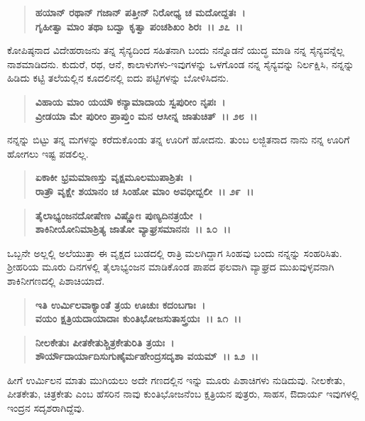 \begin{verse}
\textbf{ಹಯಾನ್ ರಥಾನ್ ಗಜಾನ್ ಪತ್ತೀನ್ ನಿರೋಧ್ಯ ಚ ಮದೋದ್ದತಃ~।}\\\textbf{ಗೃಹೀತ್ವಾ ಮಾಂ ತಥಾ ಬದ್ವಾ ಕೃತ್ವಾ ಪಂಚಶಿಖಂ ಶಿರಃ~।। ೨೭~।।} 
\end{verse}

ಕೋಪಿಷ್ಠನಾದ ವಿದೇಹರಾಜನು ತನ್ನ ಸೈನ್ಯದಿಂದ ಸಹಿತನಾಗಿ ಬಂದು ನನ್ನೊಡನೆ ಯುದ್ಧ ಮಾಡಿ ನನ್ನ ಸೈನ್ಯವನ್ನೆಲ್ಲ ನಾಶಮಾಡಿದನು. ಕುದುರೆ, ರಥ, ಆನೆ, ಕಾಲಾಳುಗಳು-ಇವುಗಳನ್ನು ಒಳಗೊಂಡ ನನ್ನ ಸೈನ್ಯವನ್ನು ನಿರ್ಲಕ್ಷಿಸಿ, ನನ್ನನ್ನು ಹಿಡಿದು ಕಟ್ಟಿ ತಲೆಯಲ್ಲಿನ ಕೂದಲಿನಲ್ಲಿ ಐದು ಪಟ್ಟಿಗಳನ್ನು ಬೋಳಿಸಿದನು.

\begin{verse}
\textbf{ವಿಹಾಯ ಮಾಂ ಯಯೌ ಕನ್ಯಾಮಾದಾಯ ಸ್ವಪುರೀಂ ನೃಪಃ~।}\\\textbf{ವ್ರೀಡಯಾ ಮೇ ಪುರೀಂ ಪ್ರಾಪ್ತುಂ ಮನ ಆಸೀನ್ನ ಜಾತುಚಿತ್~।। ೨೮~।।} 
\end{verse}

ನನ್ನನ್ನು ಬಿಟ್ಟು ತನ್ನ ಮಗಳನ್ನು ಕರೆದುಕೊಂಡು ತನ್ನ ಊರಿಗೆ ಹೋದನು. ತುಂಬ ಲಜ್ಜಿತ\-ನಾದ ನಾನು ನನ್ನ ಊರಿಗೆ ಹೋಗಲು ಇಷ್ಟ ಪಡಲಿಲ್ಲ.

\begin{verse}
\textbf{ಏಕಾಕೀ ಭ್ರಮಮಾಣಸ್ತು ವೃಕ್ಷಮೂಲಮುಪಾಶ್ರಿತಃ~।}\\\textbf{ರಾತ್ರೌ ವೃಕ್ಷೇ ಶಯಾನಂ ಚ ಸಿಂಹೋ ಮಾಂ ಅವಧೀದ್ಬಲೀ~।। ೨೯~।। }
\end{verse}

\begin{verse}
\textbf{ತೈಲಾಭ್ಯಂಜನದೋಷೇಣ ವಿಷ್ಣೋಃ ಪುಣ್ಯದಿನತ್ರಯೇ~।}\\\textbf{ಶಾಕಿನೀಯೋನಿಮಾಶ್ರಿತ್ಯ ಜಾತೋ ವ್ಯಾಘ್ರಸಮಾನನಃ~।। ೩೦~।।} 
\end{verse}

ಒಬ್ಬನೇ ಅಲ್ಲಲ್ಲಿ ಅಲೆಯುತ್ತಾ ಈ ವೃಕ್ಷದ ಬುಡದಲ್ಲಿ ರಾತ್ರಿ ಮಲಗಿದ್ದಾಗ ಸಿಂಹವು ಬಂದು ನನ್ನನ್ನು ಸಂಹರಿಸಿತು. ಶ‍್ರೀಹರಿಯ ಮೂರು ದಿನಗಳಲ್ಲಿ ತೈಲಾಭ್ಯಂಜನ ಮಾಡಿಕೊಂಡ ಪಾಪದ ಫಲವಾಗಿ ವ್ಯಾಘ್ರದ ಮುಖವುಳ್ಳವನಾಗಿ ಶಾಕಿನೀಗಣದಲ್ಲಿ ಪಿಶಾಚಿಯಾದೆ.

\begin{verse}
\textbf{ಇತಿ ಉರ್ಮಿಲವಾಕ್ಯಾಂತೆ ತ್ರಯ ಊಚುಃ ಕದಂಬಗಾಃ~।}\\\textbf{ವಯಂ ಕ್ಷತ್ರಿಯದಾಯಾದಾಃ ಕುಂತಿಭೋಜಸುತಾಸ್ತ್ರಯಃ~।। ೩೧~।। }
\end{verse}

\begin{verse}
\textbf{ನೀಲಕೇತುಃ ಪೀತಕೇತುಶ್ಚಿತ್ರಕೇತುರಿತಿ ತ್ರಯಃ~।}\\\textbf{ಶೌರ್ಯೌದಾರ್ಯಾದಿಸುಗುಣೈರ್ಮಹೇಂದ್ರಸದೃಶಾ ವಯಮ್~।। ೩೨~।। }
\end{verse}

ಹೀಗೆ ಉರ್ಮಿಲನ ಮಾತು ಮುಗಿಯಲು ಅದೇ ಗಣದಲ್ಲಿನ ಇನ್ನು ಮೂರು ಪಿಶಾಚಿಗಳು ನುಡಿದುವು. ನೀಲಕೇತು, ಪೀತಕೇತು, ಚಿತ್ರಕೇತು ಎಂಬ ಹೆಸರಿನ ನಾವು ಕುಂತಿಭೋಜನೆಂಬ ಕ್ಷತ್ರಿಯನ ಪುತ್ರರು, ಸಾಹಸ, ಔದಾರ್ಯ ಇವುಗಳಲ್ಲಿ ಇಂದ್ರನ ಸದೃಶರಾಗಿದ್ದೆವು.

